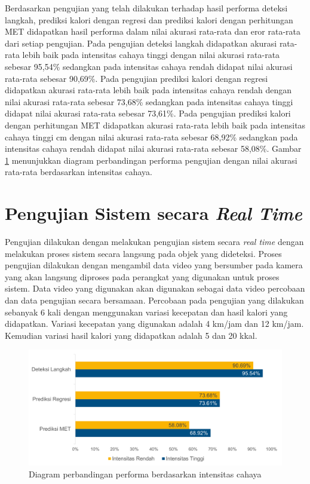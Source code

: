 Berdasarkan pengujian yang telah dilakukan terhadap hasil performa deteksi langkah, prediksi kalori dengan regresi dan prediksi kalori dengan perhitungan MET didapatkan hasil performa dalam nilai akurasi rata-rata dan eror rata-rata dari setiap pengujian. Pada pengujian deteksi langkah didapatkan akurasi rata-rata lebih baik pada intensitas cahaya tinggi dengan nilai akurasi rata-rata sebesar 95,54\% sedangkan pada intensitas cahaya rendah didapat nilai akurasi rata-rata sebesar 90,69\%. Pada pengujian prediksi kalori dengan regresi didapatkan akurasi rata-rata lebih baik pada intensitas cahaya rendah dengan nilai akurasi rata-rata sebesar 73,68\% sedangkan pada intensitas cahaya tinggi didapat nilai akurasi rata-rata sebesar 73,61\%. Pada pengujian prediksi kalori dengan perhitungan MET didapatkan akurasi rata-rata lebih baik pada intensitas cahaya tinggi cm dengan nilai akurasi rata-rata sebesar 68,92\% sedangkan pada intensitas cahaya rendah didapat nilai akurasi rata-rata sebesar 58,08\%. Gambar \ref{fig:DiagramPosisi} menunjukkan diagram perbandingan performa pengujian dengan nilai akurasi rata-rata berdasarkan intensitas cahaya.



\section{Pengujian Sistem secara \emph{Real Time}}
\label{sec:PengujianRealTime}

Pengujian dilakukan dengan melakukan pengujian sistem secara \emph{real time} dengan melakukan proses sistem secara langsung pada objek yang dideteksi. Proses pengujian dilakukan dengan mengambil data video yang bersumber pada kamera yang akan langsung diproses pada perangkat yang digunakan untuk proses sistem. Data video yang digunakan akan digunakan sebagai data video percobaan dan data pengujian secara bersamaan. Percobaan pada pengujian yang dilakukan sebanyak 6 kali dengan menggunakan variasi kecepatan dan hasil kalori yang didapatkan. Variasi kecepatan yang digunakan adalah 4 km/jam dan 12 km/jam. Kemudian variasi hasil kalori yang didapatkan adalah 5 dan 20 kkal.

\begin{figure}[H]
  \centering
  \includegraphics[scale=0.7]{gambar/diagram_cahaya.png}
  \caption{Diagram perbandingan performa berdasarkan intensitas cahaya}
  \label{fig:DiagramPosisi}
\end{figure}


